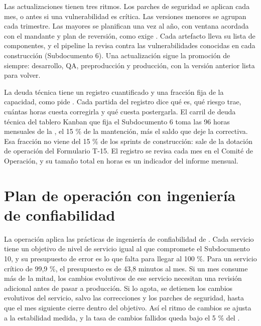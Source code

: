 Las actualizaciones tienen tres ritmos. Los parches de seguridad se aplican cada mes, o antes si una
vulnerabilidad es crítica. Las versiones menores se agrupan cada trimestre. Las mayores se planifican una
vez al año, con ventana acordada con el mandante y plan de reversión, como exige
. Cada artefacto lleva su lista de componentes, y el pipeline la revisa contra las
vulnerabilidades conocidas en cada construcción (Subdocumento 6). Una actualización sigue la promoción
de siempre: desarrollo, QA, preproducción y producción, con la versión anterior lista para volver.

La deuda técnica tiene un registro cuantificado y una fracción fija de la capacidad, como pide
. Cada partida del registro dice qué es, qué riesgo trae, cuántas horas cuesta
corregirla y qué cuesta postergarla. El carril de deuda técnica del tablero Kanban que fija el
Subdocumento 6 toma las 96 horas mensuales de la , el 15 \% de la mantención, más
el saldo que deje la correctiva. Esa fracción no viene del 15 \% de los sprints de construcción: sale de
la dotación de operación del Formulario T-15. El registro se revisa cada mes en el Comité de Operación, y
su tamaño total en horas es un indicador del informe mensual.

\section{Plan de operación con ingeniería de confiabilidad}\label{sec:11-plan-de-operacion-con-ingenieria}

La operación aplica las prácticas de ingeniería de confiabilidad de \textcite{beyer2016}. Cada servicio
tiene un objetivo de nivel de servicio igual al que compromete el Subdocumento 10, y su presupuesto de
error es lo que falta para llegar al 100 \%. Para un servicio crítico de 99,9 \%, el presupuesto es de
43,8 minutos al mes. Si un mes consume más de la mitad, los cambios evolutivos de ese servicio necesitan
una revisión adicional antes de pasar a producción. Si lo agota, se detienen los cambios evolutivos del
servicio, salvo las correcciones y los parches de seguridad, hasta que el mes siguiente cierre dentro del
objetivo. Así el ritmo de cambios se ajusta a la estabilidad medida, y la tasa de cambios fallidos queda
bajo el 5 \% del .


